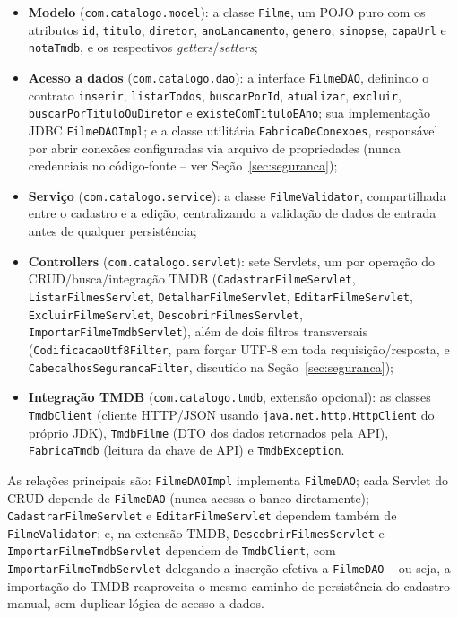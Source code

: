 \documentclass[12pt,a4paper]{article}
\begin{document}
\begin{itemize}
    \item \textbf{Modelo} (\texttt{com.catalogo.model}): a classe \texttt{Filme}, um POJO puro
        com os atributos \texttt{id}, \texttt{titulo}, \texttt{diretor}, \texttt{anoLancamento},
        \texttt{genero}, \texttt{sinopse}, \texttt{capaUrl} e \texttt{notaTmdb}, e os respectivos
        \textit{getters}/\textit{setters};
    \item \textbf{Acesso a dados} (\texttt{com.catalogo.dao}): a interface \texttt{FilmeDAO},
        definindo o contrato \texttt{inserir}, \texttt{listarTodos}, \texttt{buscarPorId},
        \texttt{atualizar}, \texttt{excluir}, \texttt{buscarPorTituloOuDiretor} e
        \texttt{existeComTituloEAno}; sua implementação JDBC \texttt{FilmeDAOImpl}; e a classe
        utilitária \texttt{FabricaDeConexoes}, responsável por abrir conexões configuradas via
        arquivo de propriedades (nunca credenciais no código-fonte -- ver
        Seção~\ref{sec:seguranca});
    \item \textbf{Serviço} (\texttt{com.catalogo.service}): a classe \texttt{FilmeValidator},
        compartilhada entre o cadastro e a edição, centralizando a validação de dados de entrada
        antes de qualquer persistência;
    \item \textbf{Controllers} (\texttt{com.catalogo.servlet}): sete Servlets, um por operação do
        CRUD/busca/integração TMDB (\texttt{CadastrarFilmeServlet}, \texttt{ListarFilmesServlet},
        \texttt{DetalharFilmeServlet}, \texttt{EditarFilmeServlet}, \texttt{ExcluirFilmeServlet},
        \texttt{DescobrirFilmesServlet}, \texttt{ImportarFilmeTmdbServlet}), além de dois filtros
        transversais (\texttt{CodificacaoUtf8Filter}, para forçar UTF-8 em toda
        requisição/resposta, e \texttt{CabecalhosSegurancaFilter}, discutido na
        Seção~\ref{sec:seguranca});
    \item \textbf{Integração TMDB} (\texttt{com.catalogo.tmdb}, extensão opcional): as classes
        \texttt{TmdbClient} (cliente HTTP/JSON usando \texttt{java.net.http.HttpClient} do
        próprio JDK), \texttt{TmdbFilme} (DTO dos dados retornados pela API),
        \texttt{FabricaTmdb} (leitura da chave de API) e \texttt{TmdbException}.
\end{itemize}

As relações principais são: \texttt{FilmeDAOImpl} implementa \texttt{FilmeDAO}; cada Servlet do
CRUD depende de \texttt{FilmeDAO} (nunca acessa o banco diretamente); \texttt{CadastrarFilmeServlet}
e \texttt{EditarFilmeServlet} dependem também de \texttt{FilmeValidator}; e, na extensão TMDB,
\texttt{DescobrirFilmesServlet} e \texttt{ImportarFilmeTmdbServlet} dependem de
\texttt{TmdbClient}, com \texttt{ImportarFilmeTmdbServlet} delegando a inserção efetiva a
\texttt{FilmeDAO} -- ou seja, a importação do TMDB reaproveita o mesmo caminho de persistência do
cadastro manual, sem duplicar lógica de acesso a dados.
\end{document}
